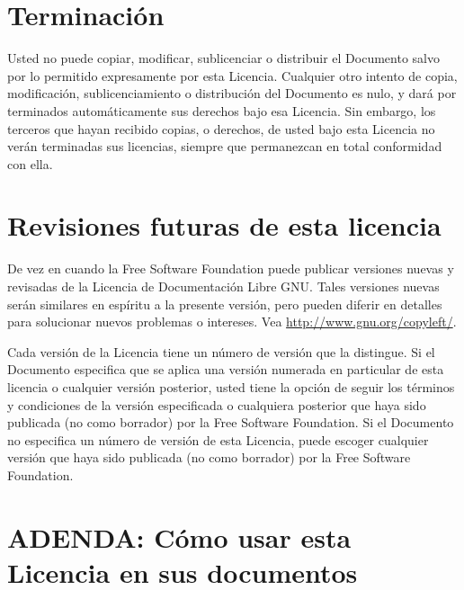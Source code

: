 \section{Terminación}

Usted no puede copiar, modificar, sublicenciar o distribuir el Documento
salvo por lo permitido expresamente por esta Licencia. Cualquier otro
intento de copia, modificación, sublicenciamiento o distribución del
Documento es nulo, y dará por terminados automáticamente sus derechos
bajo esa Licencia. Sin embargo, los terceros que hayan recibido copias,
o derechos, de usted bajo esta Licencia no verán terminadas sus licencias,
siempre que permanezcan en total conformidad con ella.

\section{Revisiones futuras de esta licencia}

De vez en cuando la Free Software Foundation puede publicar versiones
nuevas y revisadas de la Licencia de Documentación Libre GNU. Tales
versiones nuevas serán similares en espíritu a la presente versión,
pero pueden diferir en detalles para solucionar nuevos problemas o
intereses. Vea \url{http://www.gnu.org/copyleft/}.

Cada versión de la Licencia tiene un número de versión que la distingue.
Si el Documento especifica que se aplica una versión numerada en particular
de esta licencia o cualquier versión posterior, usted tiene la opción
de seguir los términos y condiciones de la versión especificada o
cualquiera posterior que haya sido publicada (no como borrador) por
la Free Software Foundation. Si el Documento no especifica un número
de versión de esta Licencia, puede escoger cualquier versión que haya
sido publicada (no como borrador) por la Free Software Foundation.

\section{ADENDA: Cómo usar esta Licencia en sus documentos}

